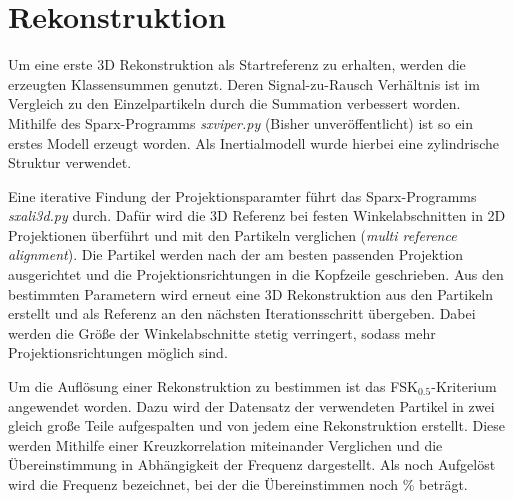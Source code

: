 \section{Rekonstruktion} %
\label{sec:rekonstruktion}

Um eine erste 3D Rekonstruktion als Startreferenz zu erhalten, werden die erzeugten Klassensummen genutzt.
Deren Signal-zu-Rausch Verhältnis ist im Vergleich zu den Einzelpartikeln durch die Summation verbessert worden.
Mithilfe des Sparx-Programms \textit{sxviper.py} (Bisher unveröffentlicht) ist so ein erstes Modell erzeugt worden.
Als Inertialmodell wurde hierbei eine zylindrische Struktur verwendet.

Eine iterative Findung der Projektionsparamter führt das Sparx-Programms \textit{sxali3d.py} durch.
Dafür wird die 3D Referenz bei festen Winkelabschnitten in 2D Projektionen überführt und mit den Partikeln verglichen (\textit{multi reference alignment}).
Die Partikel werden nach der am besten passenden Projektion ausgerichtet und die Projektionsrichtungen in die Kopfzeile geschrieben.
Aus den bestimmten Parametern wird erneut eine 3D Rekonstruktion aus den Partikeln erstellt und als Referenz an den nächsten Iterationsschritt übergeben.
Dabei werden die Größe der Winkelabschnitte stetig verringert, sodass mehr Projektionsrichtungen möglich sind.

Um die Auflösung einer Rekonstruktion zu bestimmen ist das FSK$_{0.5}$-Kriterium angewendet worden.
Dazu wird der Datensatz der verwendeten Partikel in zwei gleich große Teile aufgespalten und von jedem eine Rekonstruktion erstellt.
Diese werden Mithilfe einer Kreuzkorrelation miteinander Verglichen und die Übereinstimmung in Abhängigkeit der Frequenz dargestellt.
Als noch Aufgelöst wird die Frequenz bezeichnet, bei der die Übereinstimmen noch \unit[50]{\%} beträgt.

\FloatBarrier